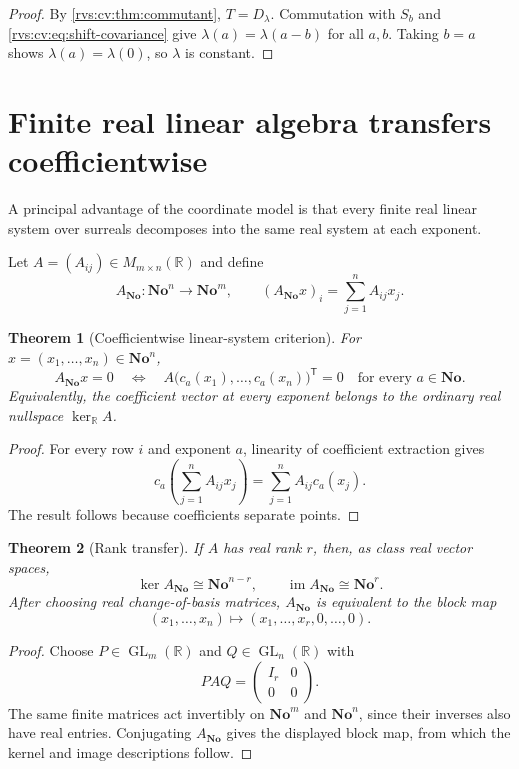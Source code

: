 \documentclass[11pt,letterpaper]{article}
\numberwithin{equation}{section}
\newtheorem{theorem}{Theorem}[section]
\theoremstyle{definition}
\theoremstyle{remark}
\newcommand{\No}{\mathbf{No}}
\newcommand{\R}{\mathbb{R}}
\newcommand{\im}{\operatorname{im}}
\begin{document}
\begin{proof}
By \cref{rvs:cv:thm:commutant}, $T=D_\lambda$. Commutation with $S_b$ and
\eqref{rvs:cv:eq:shift-covariance} give $\lambda(a)=\lambda(a-b)$ for all $a,b$.
Taking $b=a$ shows $\lambda(a)=\lambda(0)$, so $\lambda$ is constant.
\end{proof}
\section{Finite real linear algebra transfers coefficientwise}\label{rvs:cv:sec:linear-systems}

A principal advantage of the coordinate model is that every finite real linear
system over surreals decomposes into the same real system at each exponent.

Let $A=(A_{ij})\in M_{m\times n}(\R)$ and define
\[
  A_{\No}:\No^n\to\No^m,
  \qquad
  (A_{\No}x)_i=\sum_{j=1}^n A_{ij}x_j.
\]

\begin{theorem}[Coefficientwise linear-system criterion]\label{rvs:cv:thm:coefficientwise-system}
For $x=(x_1,\ldots,x_n)\in\No^n$,
\[
  A_{\No}x=0
  \quad\Longleftrightarrow\quad
  A\big(c_a(x_1),\ldots,c_a(x_n)\big)^{\mathsf T}=0
  \quad\text{for every }a\in\No.
\]
Equivalently, the coefficient vector at every exponent belongs to the ordinary
real nullspace $\ker_{\R}A$.
\end{theorem}

\begin{proof}
For every row $i$ and exponent $a$, linearity of coefficient extraction gives
\[
  c_a\left(\sum_{j=1}^n A_{ij}x_j\right)
   =\sum_{j=1}^n A_{ij}c_a(x_j).
\]
The result follows because coefficients separate points.
\end{proof}

\begin{theorem}[Rank transfer]\label{rvs:cv:thm:rank-transfer}
If $A$ has real rank $r$, then, as class real vector spaces,
\[
  \ker A_{\No}\cong\No^{n-r},
  \qquad
  \im A_{\No}\cong\No^r.
\]
After choosing real change-of-basis matrices, $A_{\No}$ is equivalent to the block
map
\[
  (x_1,\ldots,x_n)\longmapsto(x_1,\ldots,x_r,0,\ldots,0).
\]
\end{theorem}

\begin{proof}
Choose $P\in\operatorname{GL}_m(\R)$ and $Q\in\operatorname{GL}_n(\R)$ with
\[
  PAQ=\begin{pmatrix}I_r&0\\0&0\end{pmatrix}.
\]
The same finite matrices act invertibly on $\No^m$ and $\No^n$, since their
inverses also have real entries. Conjugating $A_{\No}$ gives the displayed block
map, from which the kernel and image descriptions follow.
\end{proof}
\end{document}

